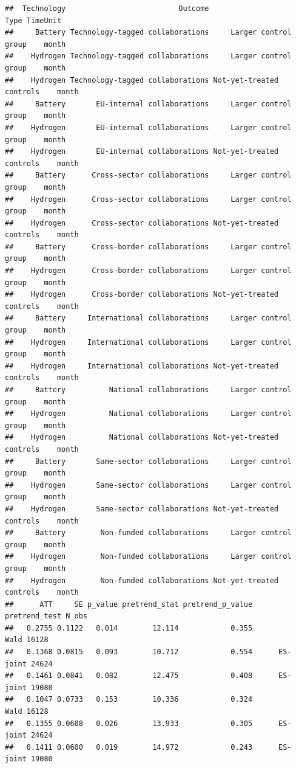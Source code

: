 \documentclass[
]{article}
\begin{document}
\begin{verbatim}
##  Technology                          Outcome                     Type TimeUnit
##     Battery Technology-tagged collaborations     Larger control group    month
##    Hydrogen Technology-tagged collaborations     Larger control group    month
##    Hydrogen Technology-tagged collaborations Not-yet-treated controls    month
##     Battery       EU-internal collaborations     Larger control group    month
##    Hydrogen       EU-internal collaborations     Larger control group    month
##    Hydrogen       EU-internal collaborations Not-yet-treated controls    month
##     Battery      Cross-sector collaborations     Larger control group    month
##    Hydrogen      Cross-sector collaborations     Larger control group    month
##    Hydrogen      Cross-sector collaborations Not-yet-treated controls    month
##     Battery      Cross-border collaborations     Larger control group    month
##    Hydrogen      Cross-border collaborations     Larger control group    month
##    Hydrogen      Cross-border collaborations Not-yet-treated controls    month
##     Battery     International collaborations     Larger control group    month
##    Hydrogen     International collaborations     Larger control group    month
##    Hydrogen     International collaborations Not-yet-treated controls    month
##     Battery          National collaborations     Larger control group    month
##    Hydrogen          National collaborations     Larger control group    month
##    Hydrogen          National collaborations Not-yet-treated controls    month
##     Battery       Same-sector collaborations     Larger control group    month
##    Hydrogen       Same-sector collaborations     Larger control group    month
##    Hydrogen       Same-sector collaborations Not-yet-treated controls    month
##     Battery        Non-funded collaborations     Larger control group    month
##    Hydrogen        Non-funded collaborations     Larger control group    month
##    Hydrogen        Non-funded collaborations Not-yet-treated controls    month
##      ATT     SE p_value pretrend_stat pretrend_p_value pretrend_test N_obs
##   0.2755 0.1122   0.014        12.114            0.355          Wald 16128
##   0.1368 0.0815   0.093        10.712            0.554      ES-joint 24624
##   0.1461 0.0841   0.082        12.475            0.408      ES-joint 19080
##   0.1047 0.0733   0.153        10.336            0.324          Wald 16128
##   0.1355 0.0608   0.026        13.933            0.305      ES-joint 24624
##   0.1411 0.0600   0.019        14.972            0.243      ES-joint 19080

\end{verbatim}
\end{document}
